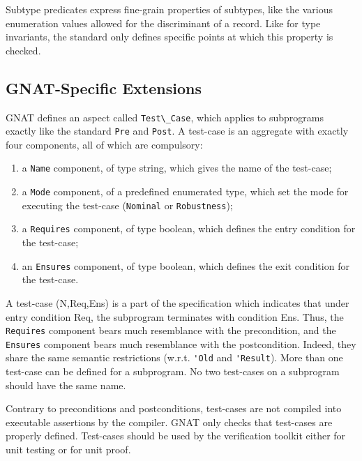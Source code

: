 \documentclass{article}
\begin{document}
Subtype predicates express fine-grain properties of subtypes, like the various
enumeration values allowed for the discriminant of a record. Like for type
invariants, the standard only defines specific points at which this property is
checked.

\subsection{GNAT-Specific Extensions}
\label{sub:formal-containers}

GNAT defines an aspect called \verb|Test\_Case|, which applies to subprograms
exactly like the standard \verb|Pre| and \verb|Post|. A test-case is an
aggregate with exactly four components, all of which are compulsory:
\begin{enumerate}
\item a \verb|Name| component, of type string, which gives the name of the
  test-case;
\item a \verb|Mode| component, of a predefined enumerated type, which set the
  mode for executing the test-case (\verb|Nominal| or \verb|Robustness|);
\item a \verb|Requires| component, of type boolean, which defines the entry
  condition for the test-case;
\item an \verb|Ensures| component, of type boolean, which defines the exit
  condition for the test-case.
\end{enumerate}

A test-case (N,Req,Ens) is a part of the specification which indicates that
under entry condition Req, the subprogram terminates with condition Ens. Thus,
the \verb|Requires| component bears much resemblance with the precondition, and
the \verb|Ensures| component bears much resemblance with the
postcondition. Indeed, they share the same semantic restrictions
(w.r.t. \verb|'Old| and \verb|'Result|).  More than one test-case can be
defined for a subprogram. No two test-cases on a subprogram should have the
same name.

Contrary to preconditions and postconditions, test-cases are not compiled into
executable assertions by the compiler. GNAT only checks that test-cases are
properly defined. Test-cases should be used by the verification toolkit either
for unit testing or for unit proof.
\end{document}
